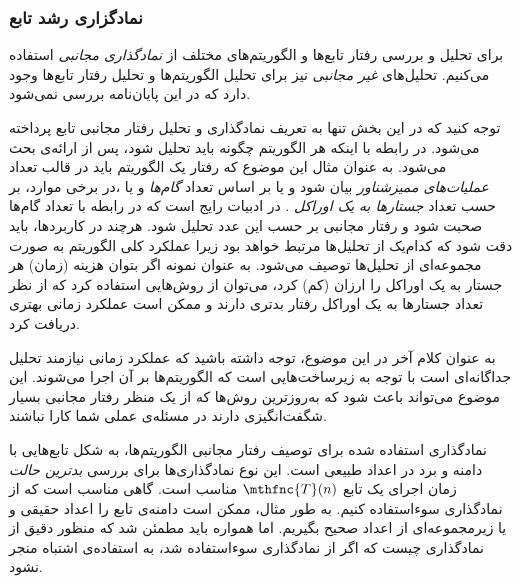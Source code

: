 
% 
%
%
%
%
%
%
%
%
%
%
%

\subsubsection{
نمادگزاری رشد تابع
\cite{clrs2009}
}
برای تحلیل و بررسی رفتار تابع‌ها و الگوریتم‌های مختلف از
\textit{
نمادگذاری مجانبی
} 
استفاده می‌کنیم. تحلیل‌های 
\textit{
غیر مجانبی
} 
نیز برای تحلیل الگوریتم‌ها و تحلیل رفتار تابع‌ها وجود دارد که در این پایان‌نامه بررسی نمی‌شود.


توجه کنید که در این بخش تنها به تعریف نمادگذاری و تحلیل رفتار مجانبی تابع پرداخته می‌شود. در رابطه با اینکه هر الگوریتم چگونه باید تحلیل شود، پس از ارائه‌ی بحث می‌شود. به عنوان مثال این موضوع که رفتار یک الگوریتم باید در قالب تعداد 
\textit{
عملیات‌های ممیزشناور
} 
بیان شود و یا بر اساس تعداد 
\textit{
گام‌ها
} 
و یا ،در برخی موارد، بر حسب تعداد
\textit{
جستارها به یک اوراکل
}. 
در ادبیات رایج است که در رابطه با تعداد گام‌ها صحبت شود و رفتار مجانبی بر حسب این عدد تحلیل شود. هرچند در کاربردها، باید دقت شود که کدام‌یک از تحلیل‌ها مرتبط خواهد بود زیرا عملکرد کلی الگوریتم به صورت مجموعه‌ای از تحلیل‌ها توصیف می‌شود. به عنوان نمونه اگر بتوان هزینه (زمان) هر جستار به یک اوراکل را ارزان (کم) کرد، می‌توان از روش‌هایی استفاده کرد که از نظر تعداد جستارها به یک اوراکل رفتار بدتری دارند و ممکن است عملکرد زمانی بهتری دریافت کرد.


به عنوان کلام آخر در این موضوع، توجه داشته باشید که عملکرد زمانی نیازمند تحلیل جداگانه‌ای است با توجه به زیرساخت‌هایی است که الگوریتم‌ها بر آن اجرا می‌شوند. این موضوع می‌تواند باعث شود که به‌روزترین روش‌ها که از یک منظر رفتار مجانبی بسیار شگفت‌انگیزی دارند در مسئله‌ی عملی شما کارا نباشند.


نمادگذاری استفاده شده برای توصیف رفتار مجانبی الگوریتم‌ها، به شکل تابع‌هایی با دامنه و برد در اعداد طبیعی است. این نوع نمادگذاری‌ها برای بررسی 
\textit{
بدترین حالت
} 
زمان اجرای یک تابع 
$\mthfnc{T}(n)$ 
مناسب است. گاهی مناسب است که از نمادگذاری سوءاستفاده کنیم. به طور مثال، ممکن است دامنه‌ی تابع را اعداد حقیقی و یا زیرمجموعه‌ای از اعداد صحیح بگیریم. اما همواره باید مطمئن شد که منظور دقیق از نمادگذاری چیست که اگر از نمادگذاری سوءاستفاده شد، به استفاده‌ی اشتباه منجر نشود.

